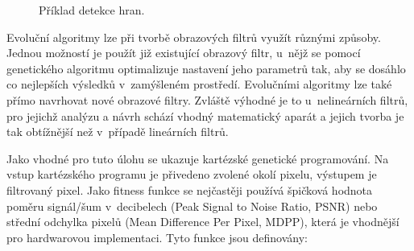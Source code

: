 \begin{figure}[htb]
    \centering
    \caption{Příklad detekce hran.}
    \label{obrDetektor}
\end{figure}



Evoluční algoritmy lze při tvorbě obrazových filtrů využít různými způsoby. Jednou možností je použít již existující obrazový filtr, u~nějž se pomocí genetického algoritmu optimalizuje nastavení jeho parametrů tak, aby se dosáhlo co nejlepších výsledků v~zamýšleném prostředí. Evolučními algoritmy lze také přímo navrhovat nové obrazové filtry. Zvláště výhodné je to u~nelineárních filtrů, pro jejichž analýzu a návrh schází vhodný matematický aparát a jejich tvorba je tak obtížnější než v~případě lineárních filtrů.

Jako vhodné pro tuto úlohu se ukazuje kartézské genetické programování. Na vstup kartézského programu je přivedeno zvolené okolí pixelu, výstupem je filtrovaný pixel. Jako fitness funkce se nejčastěji používá špičková hodnota poměru signál/šum v~decibelech (Peak Signal to Noise Ratio, PSNR) nebo střední odchylka pixelů (Mean Difference Per Pixel, MDPP), která je vhodnější pro hardwarovou implementaci. Tyto funkce jsou definovány:

